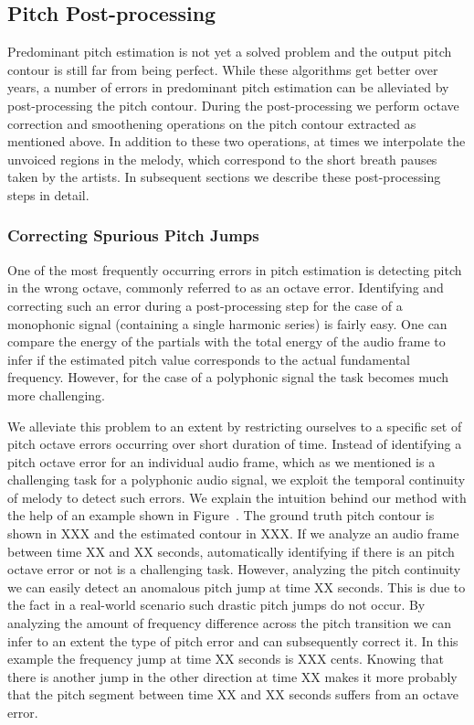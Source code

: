 {\subsection{Pitch Post-processing}
\label{sec:data_preprocessing_pitch_postprocessing}

Predominant pitch estimation is not yet a solved problem and the output pitch contour is still far from being perfect. While these algorithms get better over years, a number of errors in predominant pitch estimation can be alleviated by post-processing the pitch contour. During the post-processing we perform octave correction and smoothening operations on the pitch contour extracted as mentioned above. In addition to these two operations, at times we interpolate the unvoiced regions in the melody, which correspond to the short breath pauses taken by the artists. In subsequent sections we describe these post-processing steps in detail.

\subsubsection{Correcting Spurious Pitch Jumps}
\label{sec:data_processing_correcting_pitch_jumps}

One of the most frequently occurring errors in pitch estimation is detecting pitch in the wrong octave, commonly referred to as an octave error. Identifying and correcting such an error during a post-processing step for the case of a monophonic signal (containing a single harmonic series) is fairly easy. One can compare the energy of the partials with the total energy of the audio frame to infer if the estimated pitch value corresponds to the actual fundamental frequency. However, for the case of a polyphonic signal the task becomes much more challenging. 


We alleviate this problem to an extent by restricting ourselves to a specific set of pitch octave errors occurring over short duration of time. Instead of identifying a pitch octave error for an individual audio frame, which as we mentioned is a challenging task for a polyphonic audio signal, we exploit the temporal continuity of melody to detect such errors. We explain the intuition behind our method with the help of an example shown in Figure~. The ground truth pitch contour is shown in XXX and the estimated contour in XXX. If we analyze an audio frame between time XX and XX seconds, automatically identifying if there is an pitch octave error or not is a challenging task. However, analyzing the pitch continuity we can easily detect an anomalous pitch jump at time XX seconds. This is due to the fact in a real-world scenario such drastic pitch jumps do not occur. By analyzing the amount of frequency difference across the pitch transition we can infer to an extent the type of pitch error and can subsequently correct it. In this example the frequency jump at time XX seconds is XXX cents. Knowing that there is another jump in the other direction at time XX makes it more probably that the pitch segment between time XX and XX seconds suffers from an octave error. 

}
